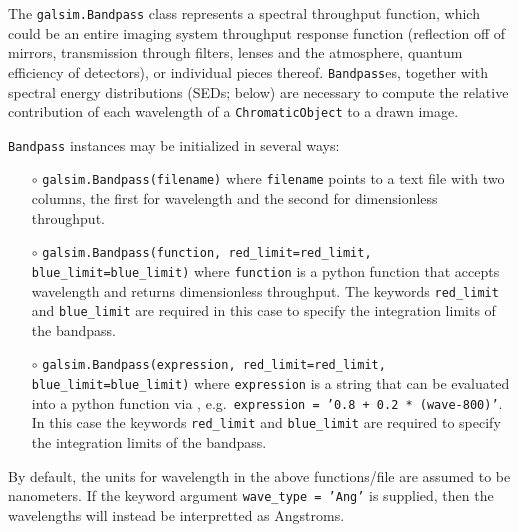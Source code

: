 \documentclass[preprint,11pt]{../../devel/modules/aastex}
\begin{document}
The \texttt{galsim.Bandpass} class represents a spectral throughput function, which could be an
entire imaging system throughput response function (reflection off of mirrors, transmission through
filters, lenses and the atmosphere, quantum efficiency of detectors), or individual pieces thereof.
\texttt{Bandpass}es, together with spectral energy distributions (SEDs; below) are necessary to
compute the relative contribution of each wavelength of a \texttt{ChromaticObject} to a drawn image.

\texttt{Bandpass} instances may be initialized in several ways:
\begin{itemize}
\item[$\circ$] {\tt galsim.Bandpass(filename)} \newline where \texttt{filename} points to a
  text file with two columns, the first for wavelength and the second for dimensionless throughput.
\item[$\circ$] {\tt galsim.Bandpass(function, red\_limit=red\_limit, blue\_limit=blue\_limit)}
  \newline where \texttt{function} is a python function that accepts wavelength and returns
  dimensionless throughput.  The keywords \texttt{red\_limit} and \texttt{blue\_limit} are required in this case
  to specify the integration limits of the bandpass.
\item[$\circ$] {\tt galsim.Bandpass(expression,
    red\_limit=red\_limit,\\
 \phantom{galsim.Bandpass(}blue\_limit=blue\_limit)}
  \newline where \texttt{expression} is a string that can be evaluated into a python function via
  ,
  \newline e.g.\ {\tt expression = '0.8 + 0.2 * (wave-800)'}. In this
  case the keywords \texttt{red\_limit} and
  \texttt{blue\_limit} are required to specify the integration limits of the bandpass.
\end{itemize}

By default, the units for wavelength in the above functions/file are assumed to be nanometers.  If
the keyword argument \texttt{wave\_type = 'Ang'} is supplied, then the wavelengths will instead be
interpretted as Angstroms.
\end{document}
